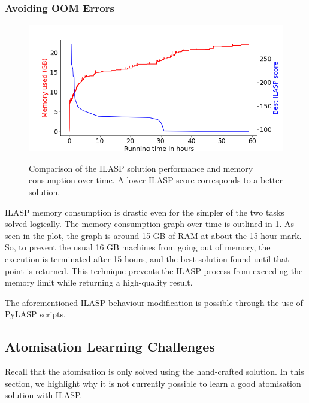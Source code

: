 \subsubsection{Avoiding OOM Errors}
\label{avoiding-oom-errors}

\begin{figure}[h]
\caption{Comparison of the ILASP solution performance and memory consumption over time. A lower ILASP score corresponds to a better solution.}
\centering
\includegraphics[width=\textwidth]{solving-nlp-tasks-logically/generalisation_memory_vs_best_score.png}
\label{generalisation-memory-graph}
\end{figure}

ILASP memory consumption is drastic even for the simpler of the two tasks solved logically.
The memory consumption graph over time is outlined in \ref{generalisation-memory-graph}.
As seen in the plot, the graph is around 15 GB of RAM at about the 15-hour mark.
So, to prevent the usual 16 GB machines from going out of memory, the execution is terminated after 15 hours, and the best solution found until that point is returned.
This technique prevents the ILASP process from exceeding the memory limit while returning a high-quality result.

The aforementioned ILASP behaviour modification is possible through the use of PyLASP scripts.

\subsection{Atomisation Learning Challenges}

Recall that the atomisation is only solved using the hand-crafted solution. 
In this section, we highlight why it is not currently possible to learn a good atomisation solution with ILASP.


